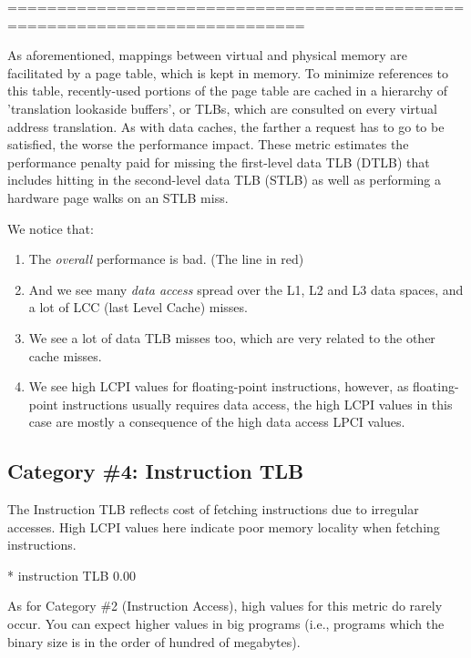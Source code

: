 ============================================================================

As aforementioned, mappings between virtual and physical memory are facilitated by a page table, which is kept in memory. To minimize references to this table, recently-used portions of the page table are cached in a hierarchy of 'translation lookaside buffers', or TLBs, which are consulted on every virtual address translation. As with data caches, the farther a request has to go to be satisfied, the worse the performance impact. These metric estimates the performance penalty paid for missing the first-level data TLB (DTLB) that includes hitting in the second-level data TLB (STLB) as well as performing a hardware page walks on an STLB miss.

We notice that:

\begin{enumerate}
  \item The \emph{overall} performance is bad. (The line in red)
  \item And we see many \emph{data access} spread over the L1, L2 and L3 data spaces, and a lot of LCC (last Level Cache) misses.
  \item We see a lot of data TLB misses too, which are very related to the other cache misses.
  \item We see high LCPI values for floating-point instructions, however, as floating-point instructions usually requires data access, the high LCPI values in this case are mostly a consequence of the high data access LPCI values.
\end{enumerate}

\subsection{Category \#4: Instruction TLB}
\label{subsec:CAT4_Instruction_TLB}

The Instruction TLB reflects cost of fetching instructions due to irregular accesses. High LCPI values here indicate poor memory locality when fetching instructions.

\begin{prompt}
* instruction TLB       0.00
\end{prompt}

As for Category \#2 (Instruction Access), high values for this metric do rarely occur. You can expect higher values in big programs (i.e., programs which the binary size is in the order of hundred of megabytes).

